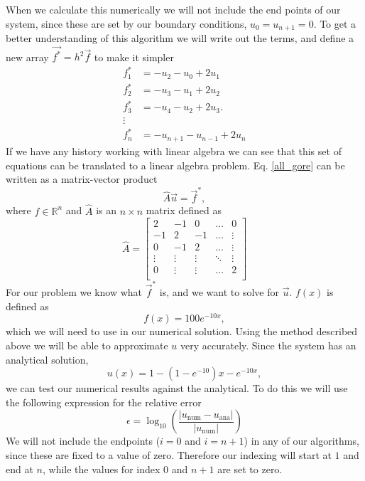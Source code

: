 \documentclass[%
 reprint,
nofootinbib,
 amsmath,amssymb,
 aps,
]{revtex4-1}
\begin{document}
When we calculate this numerically we will not include the end points of our system, since these are set by our boundary conditions, $u_0=u_{n+1}=0$. To get a better understanding of this algorithm we will write out the terms, and define a new array $\vec{f^{*}} = h^2\vec{f}$ to make it simpler
\begin{align*}
  f^{*}_1 &= -u_2 - u_0 + 2u_1 \\
  f^{*}_2 &= -u_3 - u_1 + 2u_2 \\
  f^{*}_3 &= - u_4 - u_2 + 2u_3. \\
         \vdots& \\
  f^{*}_{n} &= -u_{n+1} - u_{n-1} + 2u_{n}
\end{align*}
  If we have any history working with linear algebra we can see that this set of equations can be translated to a linear algebra problem. Eq. \eqref{all_gore} can be written as a matrix-vector product
\begin{equation}
  \hat{A} \vec{u} = \vec{f}^{*}, \label{system}
\end{equation}
where $f\in\mathds{R}^{n}$ and $\hat{A}$ is an $n\times n$ matrix defined as
\begin{equation}
  \hat{A} = \begin{bmatrix}
               2& -1 & 0 & \dots & 0 \\
               -1 & 2 & -1 &\dots &\vdots \\
               0 & -1 & 2 & \dots  & \vdots \\
               \vdots & \vdots & \vdots & \ddots &\vdots\\
               0 &  \vdots   & \vdots  & \dots & 2 \\
            \end{bmatrix}
\end{equation}
For our problem we know what $\vec{f}^*$ is, and we want to solve for $\vec{u}$. $f(x)$ is defined as
\begin{equation}
  f(x) = 100e^{-10x},
\end{equation}
which we will need to use in our numerical solution. Using the method described above we will be able to approximate $u$ very accurately. Since the system has an analytical solution,
\begin{equation}
  u(x) = 1-(1-e^{-10})x-e^{-10x}, \label{analytic_solv}
\end{equation}
we can test our numerical results against the analytical. To do this we will use the following expression for the relative error
\begin{equation}
  \epsilon = \log_{10} \left( \frac{ \lvert u_{\mathrm{num}} -u_{\mathrm{ana}}\rvert }{ \lvert  u_{\mathrm{num}} \rvert } \right) \label{calc_deviation}
\end{equation}
We will not include the endpoints ($i = 0$ and $i =  n+1$) in any of our algorithms, since these are fixed to a value of zero. Therefore our indexing will start at $1$ and end at $n$, while the values for index $0$ and $n+1$ are set to zero. \par
\end{document}
